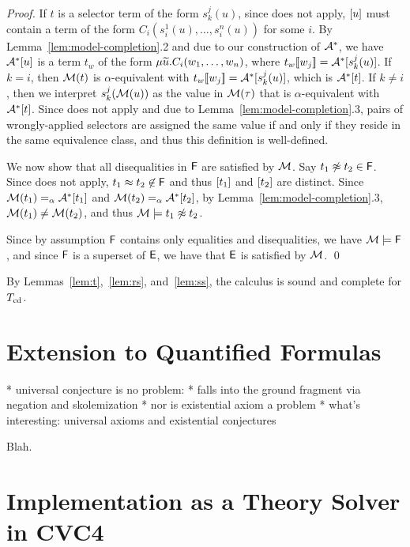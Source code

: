 \begin{proof}
If $t$ is a selector term of the form $s^j_k( u )$,
since  does not apply,
$[u]$ must contain a term of the form $C_i( s^1_i( u ), \ldots, s^{n}_i( u ) )$ for some $i$.
By Lemma~\ref{lem:model-completion}.2 and due to our construction of $\mathcal{A}^\ast$, we have $\mathcal{A}^\ast [u]$ is a term $t_w$ of the form
$\mu {\widetilde{u}}. C_i( w_1, \ldots, w_n )$,
where $t_w [\![  w_j  ]\!] = \mathcal{A}^\ast [ s^j_k( u )]$. 
If $k = i$, then $\mathcal{M}( t )$ is $\alpha$-equivalent with $t_w[\![ w_j ]\!] = \mathcal{A}^\ast [ s^j_k( u )]$,
which is $\mathcal{A}^\ast [t]$.
If $k \neq i$, then we interpret $s^j_k( \mathcal{M}( u ) )$ as the value in $\mathcal{M}( \tau )$ that is $\alpha$-equivalent with $\mathcal{A}^\ast [ t ]$.
Since  does not apply and due to Lemma~\ref{lem:model-completion}.3,
pairs of wrongly-applied selectors are assigned the same value if and only if they reside in the same equivalence class,
and thus this definition is well-defined.

We now show that all disequalities in $\mathsf{F}$ are satisfied by $\mathcal{M}$.
Say $t_1 \not\approx t_2 \in \mathsf{F}$.
Since  does not apply, $t_1 \approx t_2 \not\in \mathsf{F}$ and thus $[t_1]$ and $[t_2]$ are distinct.
Since $\mathcal{M}( t_1 ) \mathrel{=_\alpha} \mathcal{A}^\ast [t_1]$ and $\mathcal{M}( t_2 ) \mathrel{=_\alpha} \mathcal{A}^\ast [t_2]$,
by Lemma~\ref{lem:model-completion}.3, $\mathcal{M}( t_1 ) \neq \mathcal{M}( t_2 )$, and thus $\mathcal{M} \models t_1 \not\approx t_2$.

Since by assumption $\mathsf{F}$ contains only equalities and disequalities, we have $\mathcal{M} \models \mathsf{F}$,
and since $\mathsf{F}$ is a superset of $\mathsf{E}$, we have that $\mathsf{E}$ is satisfied by $\mathcal{M}$.
\qed
\end{proof}

By Lemmas~\ref{lem:t},~\ref{lem:rs}, and~\ref{lem:ss}, the calculus is sound and complete for $T_{\mathrm{cd}}$.

\section{Extension to Quantified Formulas}
\label{sec:extension-to-quantified-formulas}

  * universal conjecture is no problem:
    * falls into the ground fragment via negation
      and skolemization
  * nor is existential axiom a problem
  * what's interesting: universal axioms and existential conjectures

Blah.

\section{Implementation as a Theory Solver in CVC4}
\label{sec:the-theory-solver}

